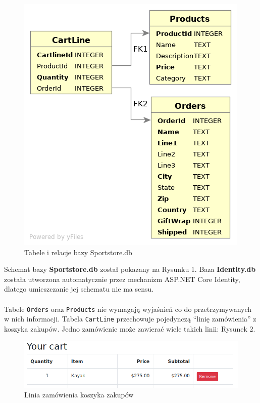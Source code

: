 \documentclass[a4paper,10pt]{article}
\begin{document}
\begin{figure}
 \centering
 \includegraphics[width=0.7\linewidth]{Images/dbDiagram.png}
 \caption{Tabele i relacje bazy Sportstore.db}
 \label{rys:}
\end{figure}
Schemat bazy \textbf{Sportstore.db} został pokazany na Rysunku 1.
Baza \textbf{Identity.db} została utworzona automatycznie przez mechanizm ASP.NET Core Identity, dlatego umieszczanie jej schematu nie ma sensu.
\paragraph{}
Tabele \texttt{Orders} oraz \texttt{Products} nie wymagają wyjaśnień co do przetrzymywanych w nich informacji. Tabela \texttt{CartLine}  przechowuje pojedynczą ``linię zamówienia'' z koszyka zakupów. Jedno zamówienie może zawierać wiele takich linii: Rysunek 2.
\begin{figure}
 \centering
 \includegraphics[width=\linewidth]{Images/lineCart.png}
 \caption{Linia zamówienia koszyka zakupów}
 \label{rys:}
\end{figure}
\end{document}
